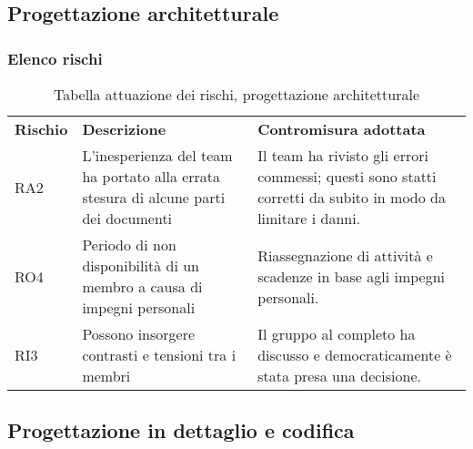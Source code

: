 \newpage
\subsection{Progettazione architetturale}
\subsubsection{Elenco rischi}
\begin{longtable}{|p{2cm}|p{6cm}|p{6cm}|}
	\arrayrulecolor{white}
	\caption{Tabella attuazione dei rischi, progettazione architetturale} \\
	\hline
	\rowcolor{header}
	\textbf{Rischio} & \textbf{Descrizione} & \textbf{Contromisura adottata} \\
	\hline
	RA2              & L'inesperienza del team ha portato alla errata stesura di alcune parti dei documenti & Il team ha rivisto gli errori commessi; questi sono statti corretti da subito in modo da limitare i danni.
	\\
	RO4 & Periodo di non disponibilità di un membro a causa di impegni personali & Riassegnazione di attività e scadenze in base agli impegni personali.
	\\
	RI3 & Possono insorgere contrasti e tensioni tra i membri & Il gruppo al completo ha discusso e democraticamente è stata presa una decisione.
\end{longtable}



\newpage
\subsection{Progettazione in dettaglio e codifica}
